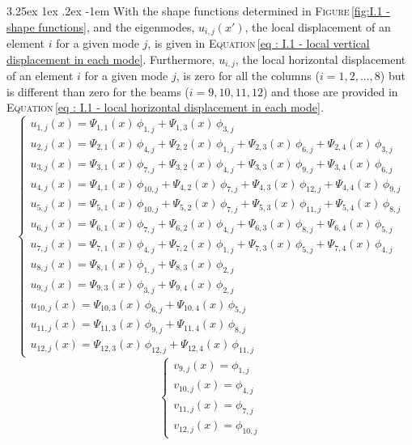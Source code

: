 \documentclass[11pt,a4paper,titlepage]{report}
\makeatletter
\renewcommand\paragraph{\@startsection{paragraph}{5}{\z@}%
  {3.25ex \@plus1ex \@minus.2ex}%
  {-1em}%
  {\normalfont\normalsize\bfseries}}
\makeatother
\begin{document}
\paragraph{} With the shape functions determined in \textsc{Figure}\,\eqref{fig:I.1 - shape functions}, and the eigenmodes, $u_{i,j}(x')$, the local displacement of an element $i$ for a given mode $j$, is given in \textsc{Equation}\,\eqref{eq : I.1 - local vertical displacement in each mode}. Furthermore, $u_{i,j}$, the local horizontal displacement of an element $i$ for a given mode $j$, is zero for all the columns ($i=1,2,...,8$) but is different than zero for the beams ($i=9,10,11,12$) and those are provided in \textsc{Equation}\,\eqref{eq : I.1 - local horizontal displacement in each mode}.
\begin{equation}
\left\lbrace
\begin{array}{l}
    u_{1,j}(x)=\Psi_{1,1}(x)\,\phi_{1,j}+\Psi_{1,3}(x)\,\phi_{3,j}\\
    u_{2,j}(x)=\Psi_{2,1}(x)\,\phi_{4,j}+\Psi_{2,2}(x)\,\phi_{1,j}+\Psi_{2,3}(x)\,\phi_{6,j}+\Psi_{2,4}(x)\,\phi_{3,j}\\
    u_{3,j}(x)=\Psi_{3,1}(x)\,\phi_{7,j}+\Psi_{3,2}(x)\,\phi_{4,j}+\Psi_{3,3}(x)\,\phi_{9,j}+\Psi_{3,4}(x)\,\phi_{6,j}\\
    u_{4,j}(x) =\Psi_{4,1}(x)\,\phi_{10,j}+\Psi_{4,2}(x)\,\phi_{7,j}+\Psi_{4,3}(x)\,\phi_{12,j}+\Psi_{4,4}(x)\,\phi_{9,j}\\
    u_{5,j}(x)=\Psi_{5,1}(x)\,\phi_{10,j}+\Psi_{5,2}(x)\,\phi_{7,j}+\Psi_{5,3}(x)\,\phi_{11,j}+\Psi_{5,4}(x)\,\phi_{8,j}\\
    u_{6,j}(x)=\Psi_{6,1}(x)\,\phi_{7,j}+\Psi_{6,2}(x)\,\phi_{4,j}+\Psi_{6,3}(x)\,\phi_{8,j}+\Psi_{6,4}(x)\,\phi_{5,j}\\
    u_{7,j}(x)=\Psi_{7,1}(x)\,\phi_{4,j}+\Psi_{7,2}(x)\,\phi_{1,j}+\Psi_{7,3}(x)\,\phi_{5,j}+\Psi_{7,4}(x)\,\phi_{4,j}\\
    u_{8,j}(x) =\Psi_{8,1}(x)\,\phi_{1,j}+\Psi_{8,3}(x)\,\phi_{2,j}\\
    u_{9,j}(x)=\Psi_{9,3}(x)\,\phi_{3,j}+\Psi_{9,4}(x)\,\phi_{2,j}\\
    u_{10,j}(x)=\Psi_{10,3}(x)\,\phi_{6,j}+\Psi_{10,4}(x)\,\phi_{5,j}\\
    u_{11,j}(x)=\Psi_{11,3}(x)\,\phi_{9,j}+\Psi_{11,4}(x)\,\phi_{8,j}\\
    u_{12,j}(x)=\Psi_{12,3}(x)\,\phi_{12,j}+\Psi_{12,4}(x)\,\phi_{11,j}
\end{array}
\right.
    \label{eq : I.1 - local vertical displacement in each mode}
\end{equation}
\begin{equation}
\left\lbrace
\begin{array}{l}
    v_{9,j}(x) = \phi_{1,j} \\
    v_{10,j}(x) =\phi_{4,j} \\
    v_{11,j}(x) = \phi_{7,j} \\
    v_{12,j}(x) = \phi_{10,j}
\end{array}
\right.
    \label{eq : I.1 - local horizontal displacement in each mode}
\end{equation}
\end{document}
